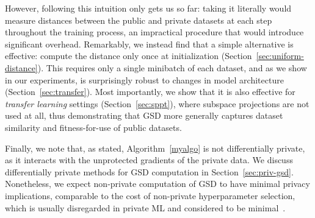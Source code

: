 \documentclass[11pt]{article}
\begin{document}
However, following this intuition only gets us so far: taking it literally would measure distances between the public and private datasets at each step throughout the training process, an impractical procedure that would introduce significant overhead. 
Remarkably, we instead find that a simple alternative is effective: compute the distance only once at initialization (Section~\ref{sec:uniform-distance}). 
This requires only a single minibatch of each dataset, and as we show in our experiments, is surprisingly robust to changes in model architecture (Section~\ref{sec:transfer}). 
Most importantly, we show that it is also effective for \emph{transfer learning} settings (Section~\ref{sec:sppt}), where subspace projections are not used at all, thus demonstrating that GSD more generally captures dataset similarity and fitness-for-use of public datasets.

Finally, we note that, as stated, Algorithm~\ref{myalgo} is not differentially private, as it interacts with the unprotected gradients of the private data. 
We discuss differentially private methods for GSD computation in Section~\ref{sec:priv-gsd}.
Nonetheless, we expect non-private computation of GSD to have minimal privacy implications, comparable to the cost of non-private hyperparameter selection, which is usually disregarded in private ML and considered to be minimal~\cite{PapernotS22,MohapatraSHKT22}.


\iffalse
Our algorithm is based on the empirical observation that the stochastic gradients stay in a lower-dimensional subspace during the training procedure of a deep learning model \cite{subspace1, subspace2}. We also empirically evaluate this finding over different datasets and model settings. Details are given in Appendix \ref{appmoreexp}. Such observation suggests that most of the information the gradient carries is contented in much lower-dimensional space. Our method finds such subspace for private and public data examples and then measures the distance between two subspaces. 

We follow the conclusion in \cite{projectionmetric} and use projection metric \cite{projectionmetric1, projectionmetric2, projmetric3, projmetric4, projmetric5} to measure the subspace distance between $\boldsymbol{V_{k}^{pub}}$ and $\boldsymbol{V_{k}^{priv}}$. Intuitively, it considers all the principal angles by averaging them to show intermediate characteristics between the two subspaces. It is suggested to be robust to the distribution of data examples and enjoys great distance structure properties such as triangle inequality~\cite{projmetric5}.
\fi
\end{document}
